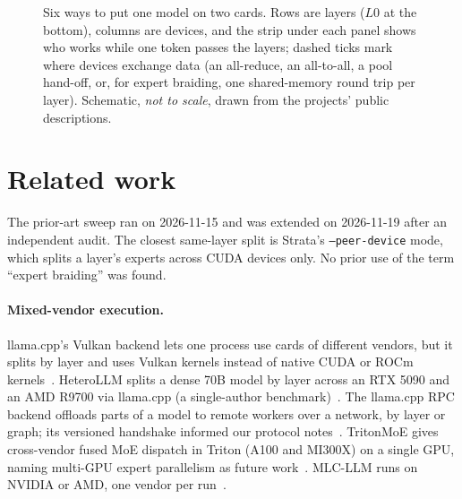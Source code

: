 \documentclass[11pt]{article}
\begin{document}
\begin{figure}[t]
\centering

\caption{Six ways to put one model on two cards. Rows are layers ($L0$ at the bottom), columns are devices, and the
strip under each panel shows who works while one token passes the layers; dashed ticks mark where devices exchange data
(an all-reduce, an all-to-all, a pool hand-off, or, for expert braiding, one shared-memory round trip per layer).
Schematic, \emph{not to scale}, drawn from the projects' public descriptions.}
\label{fig:archs}
\end{figure}

\section{Related work}
The prior-art sweep ran on 2026-11-15 and was extended on 2026-11-19 after an independent audit. The closest same-layer split is Strata's
\texttt{--peer-device} mode, which splits a layer's experts across CUDA devices only. No prior use of the term ``expert
braiding'' was found.

\paragraph{Mixed-vendor execution.} llama.cpp's Vulkan backend lets one process use cards of different vendors, but it
splits by layer and uses Vulkan kernels instead of native CUDA or ROCm kernels~\cite{llamacpp}. HeteroLLM splits a dense
70B model by layer across an RTX 5090 and an AMD R9700 via llama.cpp (a single-author benchmark)~\cite{heterollm}. The
llama.cpp RPC backend offloads parts of a model to remote workers over a network, by layer or graph; its versioned
handshake informed our protocol notes~\cite{llamacpp}. TritonMoE gives cross-vendor fused MoE dispatch in Triton
(A100 and MI300X) on a single GPU, naming multi-GPU expert parallelism as future work~\cite{tritonmoe}. MLC-LLM runs on
NVIDIA or AMD, one vendor per run~\cite{mlcllm}.
\end{document}
